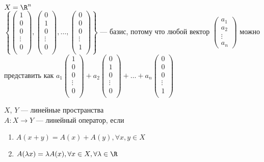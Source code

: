$X = \R^n$\\
$\left\{
\begin{pmatrix}
1\\
0\\
0\\
\vdots \\
0\\
\end{pmatrix},
\begin{pmatrix}
0\\
1\\
0\\
\vdots \\
0\\
\end{pmatrix},
\dots,
\begin{pmatrix}
0\\
0\\
0\\
\vdots \\
1\\
\end{pmatrix}
\right\}$ --- базис, потому что любой вектор 
$\begin{pmatrix}
	a_1\\
	a_2\\
	\vdots \\
	a_n 
\end{pmatrix}$ можно представить как
$a_1
\begin{pmatrix}
1\\
0\\
0\\
\vdots \\
0\\
\end{pmatrix}
+a_2
\begin{pmatrix}
0\\
1\\
0\\
\vdots \\
0\\
\end{pmatrix}
+\dots+a_n
\begin{pmatrix}
0\\
0\\
0\\
\vdots \\
1\\
\end{pmatrix}$\\
\begin{Def}
$X$, $Y$ --- линейные пространства\\
$A \colon X \rightarrow Y$ --- линейный оператор, если
\begin{enumerate}
\item $A(x + y) = A(x) + A(y), \forall x, y \in X $
\item $A(\lambda x) = \lambda A(x), \forall x \in X, \forall \lambda \in \R$
\end{enumerate}
\end{Def}
